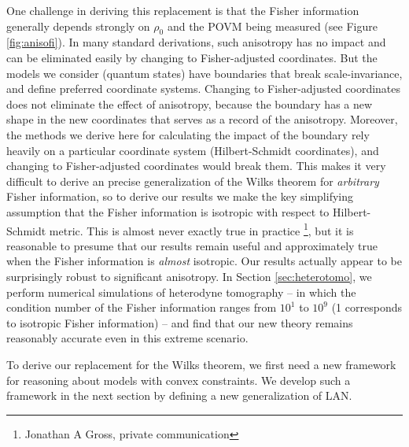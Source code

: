 \documentclass[aps,pra, twocolumn]{revtex4-1}
\begin{document}
One challenge in deriving this replacement is that the Fisher information generally depends strongly on $\rho_{0}$ and the POVM being measured (see Figure \ref{fig:anisofi}).  In many standard derivations, such anisotropy has no impact and can be eliminated easily by changing to Fisher-adjusted coordinates.  But the models we consider (quantum states) have boundaries that break scale-invariance, and define preferred coordinate systems. Changing to Fisher-adjusted coordinates does not eliminate the effect of anisotropy, because the boundary has a new shape in the new coordinates that serves as a record of the anisotropy.  Moreover, the methods we derive here for calculating the impact of the boundary rely heavily on a particular coordinate system (Hilbert-Schmidt coordinates), and changing to Fisher-adjusted coordinates would break them.  This makes it very difficult to derive an precise generalization of the Wilks theorem for \emph{arbitrary} Fisher information, so to derive our results we make the key simplifying assumption that the Fisher information is isotropic with respect to Hilbert-Schmidt metric.  This is almost never exactly true in practice \footnote{Jonathan A Gross, private communication}, but it is reasonable to presume that our results remain useful and approximately true when the Fisher information is \emph{almost} isotropic.  Our results actually appear to be surprisingly robust to significant anisotropy.  In Section \ref{sec:heterotomo}, we perform numerical simulations of heterodyne tomography -- in which the condition number of the Fisher information ranges from $10^1$ to $10^9$ (1 corresponds to isotropic Fisher information) -- and find that our new theory remains reasonably accurate even in this extreme scenario.


To derive our replacement for the Wilks theorem, we first need a new framework for reasoning about models with convex constraints. We develop such a framework in the next section by defining a new generalization of LAN.
\end{document}
